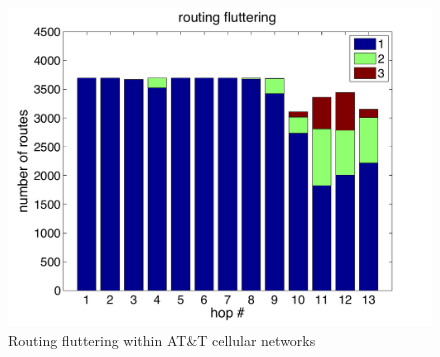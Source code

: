 \begin{figure}
  \centering
  \includegraphics[width=\linewidth]{../figs/mobile_fluttering.pdf}
  \vspace{-1em}
  \caption{Routing fluttering within AT\&T cellular networks}
  \label{fig:mobile_fluttering}
\end{figure}

